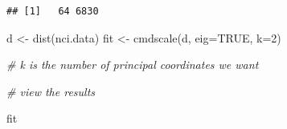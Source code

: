 \documentclass[
]{article}
\newenvironment{Shaded}{\begin{snugshade}}{\end{snugshade}}
\newcommand{\AttributeTok}[1]{\textcolor[rgb]{0.77,0.63,0.00}{#1}}
\newcommand{\CommentTok}[1]{\textcolor[rgb]{0.56,0.35,0.01}{\textit{#1}}}
\newcommand{\ConstantTok}[1]{\textcolor[rgb]{0.00,0.00,0.00}{#1}}
\newcommand{\DecValTok}[1]{\textcolor[rgb]{0.00,0.00,0.81}{#1}}
\newcommand{\FunctionTok}[1]{\textcolor[rgb]{0.00,0.00,0.00}{#1}}
\newcommand{\NormalTok}[1]{#1}
\newcommand{\OtherTok}[1]{\textcolor[rgb]{0.56,0.35,0.01}{#1}}
\begin{document}
\begin{verbatim}
## [1]   64 6830
\end{verbatim}

\begin{Shaded}
\begin{Highlighting}[]
\NormalTok{d }\OtherTok{\textless{}{-}} \FunctionTok{dist}\NormalTok{(nci.data)}
\NormalTok{fit }\OtherTok{\textless{}{-}} \FunctionTok{cmdscale}\NormalTok{(d, }\AttributeTok{eig=}\ConstantTok{TRUE}\NormalTok{, }\AttributeTok{k=}\DecValTok{2}\NormalTok{)}

\CommentTok{\# k is the number of principal coordinates we want}

\CommentTok{\# view the results}

\NormalTok{fit}
\end{Highlighting}
\end{Shaded}
\end{document}
